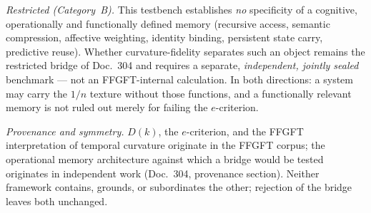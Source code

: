 \emph{Restricted (Category~B).} This testbench establishes \emph{no} specificity of a cognitive,
operationally and functionally defined memory (recursive access, semantic compression, affective
weighting, identity binding, persistent state carry, predictive reuse). Whether curvature-fidelity
separates such an object remains the restricted bridge of Doc.~304 and requires a separate,
\emph{independent, jointly sealed} benchmark --- not an FFGFT-internal calculation. In both
directions: a system may carry the $1/n$ texture without those functions, and a functionally
relevant memory is not ruled out merely for failing the $e$-criterion.

\emph{Provenance and symmetry.} $D(k)$, the $e$-criterion, and the FFGFT interpretation of
temporal curvature originate in the FFGFT corpus; the operational memory architecture against
which a bridge would be tested originates in independent work (Doc.~304, provenance section).
Neither framework contains, grounds, or subordinates the other; rejection of the bridge leaves
both unchanged.
